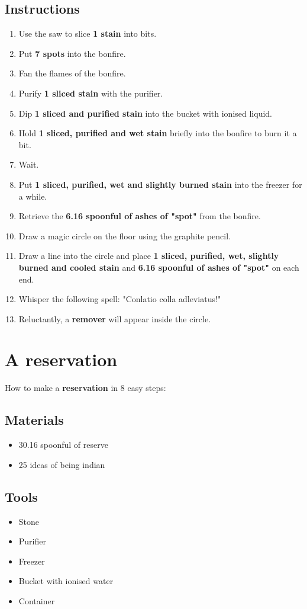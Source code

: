 \documentclass{article}
\begin{document}
\subsection{Instructions}\begin{enumerate}
\item 
Use the saw to slice \textbf{1 stain} into bits.
\item 
Put \textbf{7 spots} into the bonfire.
\item 
Fan the flames of the bonfire.
\item 
Purify \textbf{1 sliced stain} with the purifier.
\item 
Dip \textbf{1 sliced and purified stain} into the bucket with ionised liquid.
\item 
Hold \textbf{1 sliced, purified and wet stain} briefly into the bonfire to burn it a bit.
\item 
Wait.
\item 
Put \textbf{1 sliced, purified, wet and slightly burned stain} into the freezer for a while.
\item 
Retrieve the \textbf{6.16 spoonful of ashes of "spot"} from the bonfire.
\item 
Draw a magic circle on the floor using the graphite pencil.
\item 
Draw a line into the circle and place \textbf{1 sliced, purified, wet, slightly burned and cooled stain} and \textbf{6.16 spoonful of ashes of "spot"} on each end.
\item 
Whisper the following spell: "Conlatio colla adleviatus!"
\item 
Reluctantly, a \textbf{remover} will appear inside the circle.
\end{enumerate}
\newpage
\section{A reservation}How to make a \textbf{reservation} in 8 easy steps:

\subsection{Materials}\begin{itemize}
\item 
30.16 spoonful of reserve
\item 
25 ideas of being indian
\end{itemize}
\subsection{Tools}\begin{itemize}
\item 
Stone
\item 
Purifier
\item 
Freezer
\item 
Bucket with ionised water
\item 
Container
\end{itemize}
\end{document}
